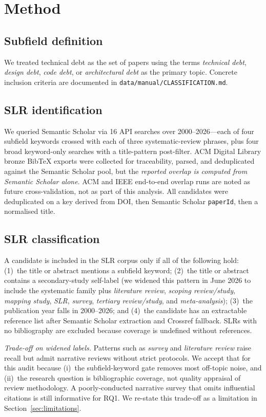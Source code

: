 \documentclass[conference]{IEEEtran}
\begin{document}
\section{Method}

\subsection{Subfield definition}
We treated technical debt as the set of papers using the terms
\emph{technical debt}, \emph{design debt}, \emph{code debt}, or
\emph{architectural debt} as the primary topic. Concrete inclusion criteria
are documented in \texttt{data/manual/CLASSIFICATION.md}.

\subsection{SLR identification}
We queried Semantic Scholar via 16 API searches over 2000--2026---each of
four subfield keywords crossed with each of three systematic-review phrases,
plus four broad keyword-only searches with a title-pattern post-filter. ACM
Digital Library bronze BibTeX exports were collected for traceability,
parsed, and deduplicated against the Semantic Scholar pool, but the
\emph{reported overlap is computed from Semantic Scholar alone}. ACM and
IEEE end-to-end overlap runs are noted as future cross-validation, not as
part of this analysis. All candidates were deduplicated on a key derived
from DOI, then Semantic Scholar \texttt{paperId}, then a normalised title.

\subsection{SLR classification}
A candidate is included in the SLR corpus only if all of the following hold:
(1)~the title or abstract mentions a subfield keyword; (2)~the title or
abstract contains a secondary-study self-label (we widened this pattern in
June 2026 to include the systematic family plus \emph{literature review},
\emph{scoping review/study}, \emph{mapping study}, \emph{SLR}, \emph{survey},
\emph{tertiary review/study}, and \emph{meta-analysis}); (3)~the publication
year falls in 2000--2026; and (4)~the candidate has an extractable reference
list after Semantic Scholar extraction and Crossref fallback. SLRs with no
bibliography are excluded because coverage is undefined without references.

\emph{Trade-off on widened labels.} Patterns such as \emph{survey} and
\emph{literature review} raise recall but admit narrative reviews without
strict protocols. We accept that for this audit because (i)~the
subfield-keyword gate removes most off-topic noise, and (ii)~the research
question is bibliographic coverage, not quality appraisal of review
methodology. A poorly-conducted narrative survey that omits influential
citations is still informative for RQ1. We re-state this trade-off as a
limitation in Section~\ref{sec:limitations}.
\end{document}
